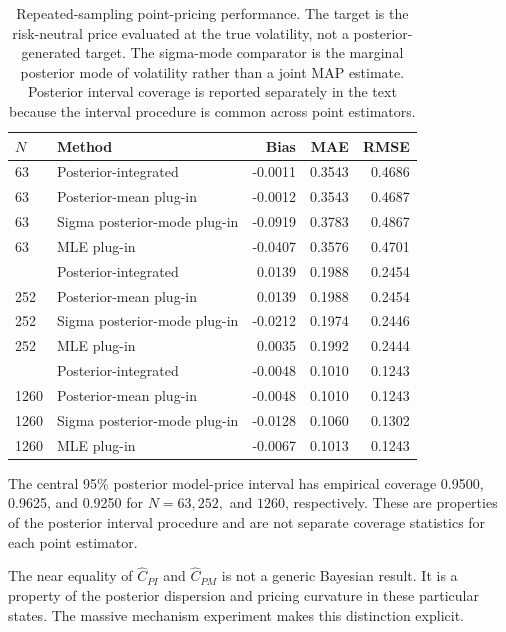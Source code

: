 \begin{table}[t]
\centering
\caption{Repeated-sampling point-pricing performance. The target is the risk-neutral price evaluated at the true volatility, not a posterior-generated target. The sigma-mode comparator is the marginal posterior mode of volatility rather than a joint MAP estimate. Posterior interval coverage is reported separately in the text because the interval procedure is common across point estimators.}\label{tab:synthetic_pilot}
\begin{tabular}{llrrr}
\toprule
$N$ & Method & Bias & MAE & RMSE\\
\midrule
63 & Posterior-integrated & -0.0011 & 0.3543 & 0.4686\\
63 & Posterior-mean plug-in & -0.0012 & 0.3543 & 0.4687\\
63 & Sigma posterior-mode plug-in & -0.0919 & 0.3783 & 0.4867\\
63 & MLE plug-in & -0.0407 & 0.3576 & 0.4701\\
\addlinespace
252 & Posterior-integrated & 0.0139 & 0.1988 & 0.2454\\
252 & Posterior-mean plug-in & 0.0139 & 0.1988 & 0.2454\\
252 & Sigma posterior-mode plug-in & -0.0212 & 0.1974 & 0.2446\\
252 & MLE plug-in & 0.0035 & 0.1992 & 0.2444\\
\addlinespace
1260 & Posterior-integrated & -0.0048 & 0.1010 & 0.1243\\
1260 & Posterior-mean plug-in & -0.0048 & 0.1010 & 0.1243\\
1260 & Sigma posterior-mode plug-in & -0.0128 & 0.1060 & 0.1302\\
1260 & MLE plug-in & -0.0067 & 0.1013 & 0.1243\\
\bottomrule
\end{tabular}
\end{table}

The central 95\% posterior model-price interval has empirical coverage 0.9500, 0.9625, and 0.9250 for $N=63,252,$ and $1260$, respectively. These are properties of the posterior interval procedure and are not separate coverage statistics for each point estimator.

The near equality of $\widehat C_{PI}$ and $\widehat C_{PM}$ is not a generic Bayesian result. It is a property of the posterior dispersion and pricing curvature in these particular states. The massive mechanism experiment makes this distinction explicit.

